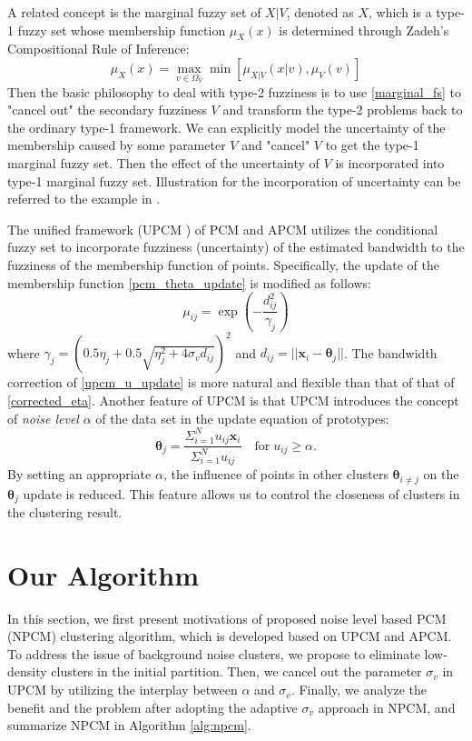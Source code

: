 \documentclass[journal]{IEEEtran}
\theoremstyle{definition}
\begin{document}
A related concept is the marginal fuzzy set of $X|V$, denoted as $X$, which is a type-1 fuzzy set whose membership function $\mu_X(x)$ is determined through Zadeh's Compositional Rule of Inference:
\begin{equation}
\label{marginal_fs}
\mu_X(x)=\max_{v\in\Omega_V}\min[\mu_{X|V}(x|v),\mu_V(v)]
\end{equation}
Then the basic philosophy to deal with type-2 fuzziness is to use \eqref{marginal_fs} to "cancel out" the secondary fuzziness $V$ and transform the type-2 problems back to the ordinary type-1 framework. We can explicitly model the uncertainty of the membership caused by some parameter $V$ and "cancel" $V$ to get the type-1 marginal fuzzy set. Then the effect of the uncertainty of $V$ is incorporated into type-1 marginal fuzzy set.
Illustration for the incorporation of uncertainty can be referred to the example in \cite{hou_pcm_2016}.

The unified framework (UPCM \cite{hou_pcm_2016}) of PCM and APCM utilizes the conditional fuzzy set to incorporate fuzziness (uncertainty) of the estimated bandwidth to the fuzziness of the membership function of points. Specifically, the update of the membership function \eqref{pcm_theta_update} is modified as follows:
\begin{equation}
\label{upcm_u_update}
\mu_{ij}=\exp\left(-\frac{d_{ij}^2}{\gamma_j}\right)
\end{equation}
where $\gamma_j=\left(0.5\eta_{j}+0.5\sqrt{\eta_{j}^{2}+4\sigma_vd_{ij}}\right)^2$ and $d_{ij}=||\mathbf{x}_i-\boldsymbol{\theta}_j||$.
The bandwidth correction of \eqref{upcm_u_update} is more natural and flexible than that of that of \eqref{corrected_eta}.
Another feature of UPCM is that UPCM introduces the concept of \emph{noise level} $\alpha$ of the data set in the update equation of prototypes:
\begin{equation}
\label{upcm_theta_update}
\boldsymbol{\theta}_j=\frac{\Sigma_{i=1}^Nu_{ij}\mathbf{x}_i}{\Sigma_{i=1}^Nu_{ij}} \quad \text{for}\;u_{ij}\geq \alpha.
\end{equation}
By setting an appropriate $\alpha$, the influence of points in other clusters $\boldsymbol{\theta}_{i\neq j}$ on the $\boldsymbol{\theta}_j$ update is reduced. This feature allows us to control the closeness of clusters in the clustering result.
\section{Our Algorithm}
\label{sec-3}
In this section, we first present motivations of proposed noise level based PCM (NPCM) clustering algorithm, which is developed based on UPCM and APCM. To address the issue of background noise clusters, we propose to eliminate low-density clusters in the initial partition. Then, we cancel out the parameter $\sigma_v$ in UPCM by utilizing the interplay between $\alpha$ and $\sigma_v$. Finally, we analyze the benefit and the problem after adopting the adaptive $\sigma_v$ approach in NPCM, and summarize NPCM in Algorithm \ref{alg:npcm}.
\end{document}
